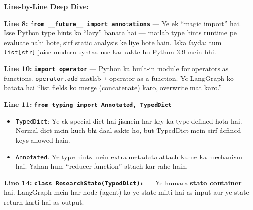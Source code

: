 \documentclass[12pt, a4paper]{article}
\begin{document}
\begin{codestorybox}
\textbf{Line-by-Line Deep Dive:}

\textbf{Line 8: \texttt{from \_\_future\_\_ import annotations}} --- Ye ek ``magic import'' hai. Isse Python type hints ko ``lazy'' banata hai --- matlab type hints runtime pe evaluate nahi hote, sirf static analysis ke liye hote hain. Iska fayda: tum \texttt{list[str]} jaise modern syntax use kar sakte ho Python 3.9 mein bhi.

\textbf{Line 10: \texttt{import operator}} --- Python ka built-in module for operators as functions. \texttt{operator.add} matlab \texttt{+} operator as a function. Ye LangGraph ko batata hai ``list fields ko merge (concatenate) karo, overwrite mat karo.''

\textbf{Line 11: \texttt{from typing import Annotated, TypedDict}} ---
\begin{itemize}[leftmargin=*]
\item \texttt{TypedDict}: Ye ek special dict hai jismein har key ka type defined hota hai. Normal dict mein kuch bhi daal sakte ho, but TypedDict mein sirf defined keys allowed hain.
\item \texttt{Annotated}: Ye type hints mein extra metadata attach karne ka mechanism hai. Yahan hum ``reducer function'' attach kar rahe hain.
\end{itemize}

\textbf{Line 14: \texttt{class ResearchState(TypedDict):}} --- Ye humara \textbf{state container} hai. LangGraph mein har node (agent) ko ye state milti hai as input aur ye state return karti hai as output.
\end{codestorybox}
\end{document}
